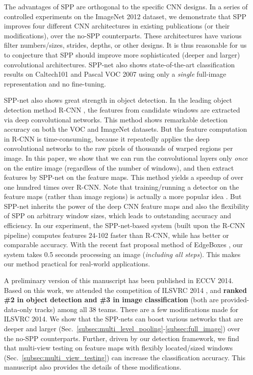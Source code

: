 \documentclass[10pt,journal,cspaper,compsoc]{IEEEtran}
\begin{document}
The advantages of SPP are orthogonal to the specific CNN designs. In a series of controlled experiments on the ImageNet 2012 dataset, we demonstrate that SPP improves four different CNN architectures in existing publications \cite{Krizhevsky2012,Zeiler2013,Sermanet2013} (or their modifications), over the no-SPP counterparts. These architectures have various filter numbers/sizes, strides, depths, or other designs.
It is thus reasonable for us to conjecture that SPP should improve more sophisticated (deeper and larger) convolutional architectures.
SPP-net also shows state-of-the-art classification results on Caltech101 \cite{Fei-Fei2007} and Pascal VOC 2007 \cite{Everingham2007} using only a \emph{single} full-image representation and no fine-tuning.

SPP-net also shows great strength in object detection.
In the leading object detection method R-CNN \cite{Girshick2014}, the features from candidate windows are extracted via deep convolutional networks. This method shows remarkable detection accuracy on both the VOC and ImageNet datasets. But the feature computation in R-CNN is time-consuming, because it repeatedly applies the deep convolutional networks to the raw pixels of thousands of warped regions per image. In this paper, we show that we can run the convolutional layers only \emph{once} on the entire image (regardless of the number of windows), and then extract features by SPP-net on the feature maps. This method yields a speedup of over one hundred times over R-CNN. Note that training/running a detector on the feature maps (rather than image regions) is actually a more popular idea \cite{Felzenszwalb2010,Dalal2005,Sande2011,Sermanet2013}.
But SPP-net inherits the power of the deep CNN feature maps and also the flexibility of SPP on arbitrary window sizes, which leads to outstanding accuracy and efficiency.
In our experiment, the SPP-net-based system (built upon the R-CNN pipeline) computes features 24-102 faster than R-CNN, while has better or comparable accuracy. With the recent fast proposal method of EdgeBoxes \cite{Zitnick2014}, our system takes 0.5 seconds processing an image (\emph{including all steps}). This makes our method practical for real-world applications.

A preliminary version of this manuscript has been published in ECCV 2014. Based on this work,
we attended the competition of ILSVRC 2014 \cite{Russakovsky2014},
and \textbf{ranked \#2 in object detection and \#3 in image classification} (both are provided-data-only tracks) among all 38 teams. There are a few modifications made for ILSVRC 2014. We show that the SPP-nets can boost various networks that are deeper and larger (Sec.~\ref{subsec:multi_level_pooling}-\ref{subsec:full_image}) over the no-SPP counterparts. Further, driven by our detection framework, we find that multi-view testing on feature maps with flexibly located/sized windows (Sec.~\ref{subsec:multi_view_testing}) can increase the classification accuracy. This manuscript also provides the details of these modifications.
\end{document}
